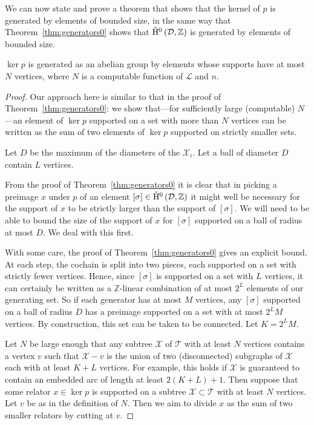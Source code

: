 We can now state and prove a theorem that shows that the kernel of $p$ is
generated by elements of bounded size, in the same way that
Theorem~\ref{thm:generators0} shows that $\check{\mathrm{H}}{}^0\left(\mathcal{D},
\mathbb{Z}\right)$ is generated by elements of bounded size.

\begin{thm}\label{thm:relators0} $\ker p$ is generated as an abelian group by
elements whose supports have at most $N$ vertices, where $N$ is a
computable function of $\mathcal{L}$ and $n$.\end{thm}

\begin{proof} Our approach here is similar to that in the proof of
Theorem~\ref{thm:generators0}: we show that---for sufficiently large
(computable) $N$---an element of $\ker p$ supported on a set with more
than $N$ vertices can be written as the sum of two elements of $\ker p$
supported on strictly smaller sets.

Let $D$ be the maximum of the diameters of the $\mathcal{X}_i$. Let a ball
of diameter $D$ contain $L$ vertices.

From the proof of Theorem~\ref{thm:generators0} it is clear that in picking a
preimage $x$ under $p$ of an element $\left[\sigma\right] \in
\check{\mathrm{H}}{}^0\left( \mathcal{D}, \mathbb{Z}\right)$ it might well be necessary for
the support of $x$ to be strictly larger than the support of
$\left[\sigma\right]$. We will need to be able to bound the size of the
support of $x$ for $\left[\sigma\right]$ supported on a ball of radius
at most $D$. We deal with this first.

With some care, the proof of Theorem~\ref{thm:generators0} gives an explicit
bound. At each step, the cochain is split into two pieces, each supported on a
set with strictly fewer vertices. Hence, since $\left[\sigma\right]$ is
supported on a set with $L$ vertices, it can certainly be written as a
$\mathbb{Z}$-linear combination of at most $2^L$ elements of our generating
set. So if each generator has at most $M$ vertices, any
$\left[\sigma\right]$ supported on a ball of radius $D$ has a preimage
supported on a set with at most $2^L M$ vertices. By construction, this set
can be taken to be connected. Let $K=2^L M$.

Let $N$ be large enough that any subtree $\mathcal{X}$ of $\mathcal{T}$
with at least $N$ vertices contains a vertex $v$ such that $\mathcal{X} -
v$ is the union of two (disconnected) subgraphs of $\mathcal{X}$ each with
at least $K+L$ vertices. For example, this holds if $\mathcal{X}$ is
guaranteed to contain an embedded arc of length at least $2\left(K+L\right)
+1$. Then suppose that some relator $x \in \ker p$ is supported on a subtree
$\mathcal{X} \subset \mathcal{T}$ with at least $N$ vertices. Let $v$ be
as in the definition of $N$. Then we aim to divide $x$ as the sum of two
smaller relators by cutting at $v$.


\end{proof}
